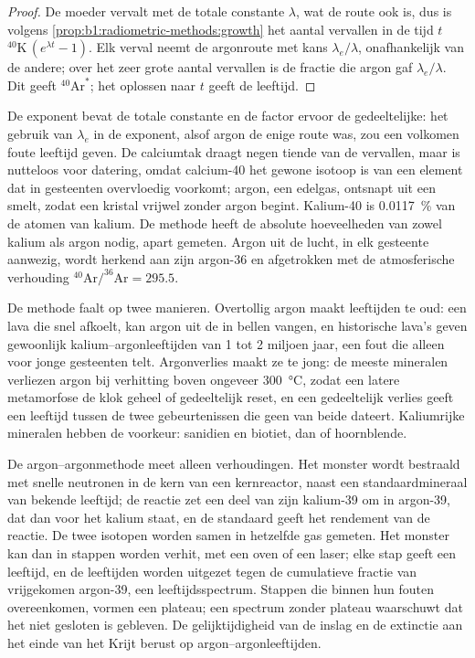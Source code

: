 \begin{proof}
De moeder vervalt met de totale constante $\lambda$, wat de route ook is, dus is volgens
\cref{prop:b1:radiometric-methods:growth} het aantal vervallen in de tijd $t$
${}^{40}\mathrm{K}\,(e^{\lambda t} - 1)$. Elk verval neemt de argonroute met kans $\lambda_e/\lambda$, onafhankelijk van de andere; over het zeer grote aantal vervallen is de fractie die argon gaf $\lambda_e/\lambda$. Dit geeft ${}^{40}\mathrm{Ar}^*$; het oplossen naar $t$ geeft de leeftijd.
\end{proof}

De exponent bevat de totale constante en de factor ervoor de gedeeltelijke: het gebruik van $\lambda_e$ in de exponent, alsof argon de enige route was, zou een volkomen foute leeftijd geven. De calciumtak draagt negen tiende van de vervallen, maar is nutteloos voor datering, omdat calcium-40 het gewone isotoop is van een element dat in gesteenten overvloedig voorkomt; argon, een edelgas, ontsnapt uit een smelt, zodat een kristal vrijwel zonder argon begint. Kalium-40 is \qty{0.0117}{\percent} van de atomen van kalium. De methode heeft de absolute hoeveelheden van zowel kalium als argon nodig, apart gemeten. Argon uit de lucht, in elk gesteente aanwezig, wordt herkend aan zijn argon-36 en afgetrokken met de atmosferische verhouding
$^{40}\mathrm{Ar}/^{36}\mathrm{Ar} = 295.5$.

De methode faalt op twee manieren. Overtollig argon maakt leeftijden te oud: een lava die snel afkoelt, kan argon uit de  in bellen vangen, en historische lava's geven gewoonlijk kalium--argonleeftijden van 1 tot 2 miljoen jaar, een fout die alleen voor jonge gesteenten telt. Argonverlies maakt ze te jong: de meeste mineralen verliezen argon bij verhitting boven ongeveer \qty{300}{\celsius}, zodat een latere metamorfose de klok geheel of gedeeltelijk reset, en een gedeeltelijk verlies geeft een leeftijd tussen de twee gebeurtenissen die geen van beide dateert. Kaliumrijke mineralen hebben de voorkeur: sanidien en biotiet, dan  of hoornblende.

De argon--argonmethode meet alleen verhoudingen. Het monster wordt bestraald met snelle neutronen in de kern van een kernreactor, naast een standaardmineraal van bekende leeftijd; de reactie zet een deel van zijn kalium-39 om in argon-39, dat dan voor het kalium staat, en de standaard geeft het rendement van de reactie. De twee isotopen worden samen in hetzelfde gas gemeten. Het monster kan dan in stappen worden verhit, met een oven of een laser; elke stap geeft een leeftijd, en de leeftijden worden uitgezet tegen de cumulatieve fractie van vrijgekomen argon-39, een leeftijdsspectrum. Stappen die binnen hun fouten overeenkomen, vormen een plateau; een spectrum zonder plateau waarschuwt dat het  niet gesloten is gebleven. De gelijktijdigheid van de inslag en de extinctie aan het einde van het Krijt berust op argon--argonleeftijden.


